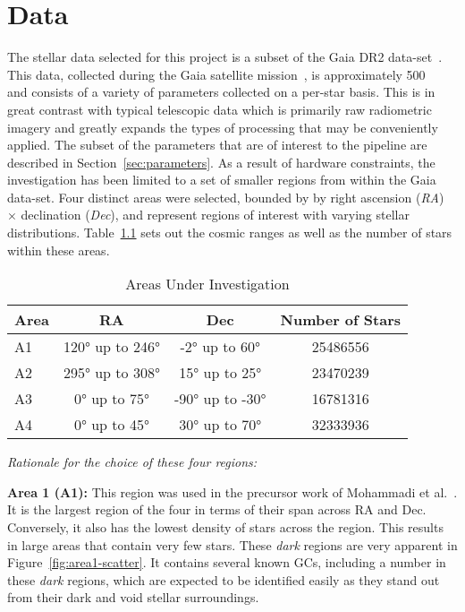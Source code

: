 \chapter{\label{chap:data}Data}

The stellar data selected for this project is a subset of the Gaia DR2 data-set~\cite{gaiaDr2}. This data, collected during the Gaia satellite mission~\cite{gaiaDr2}, is approximately \SI{500}{\giga\byte} and consists of a variety of parameters collected on a per-star basis. This is in great contrast with typical telescopic data which is primarily raw radiometric imagery and greatly expands the types of processing that may be conveniently applied. The subset of the parameters that are of interest to the pipeline are described in Section~\ref{sec:parameters}. As a result of hardware constraints, the investigation has been limited to a set of smaller regions from within the Gaia data-set. Four distinct areas were selected, bounded by by right ascension (\textit{RA}) $\times$ declination (\textit{Dec}), and represent regions of interest with varying stellar distributions. Table~\ref{tb:areas} sets out the cosmic ranges as well as the number of stars within these areas.

\begin{table}[H]
    \centering
    \caption{Areas Under Investigation}
    \label{tb:areas}
    \begin{tabular}{l c c c}
        \toprule
        Area & RA                        & Dec                       & Number of Stars \\
        \midrule
        A1   & \ang{120} up to \ang{246} & \ang{-2} up to \ang{60}   & \num{25486556}  \\
        A2   & \ang{295} up to \ang{308} & \ang{15} up to \ang{25}   & \num{23470239}  \\
        A3   & \ang{0} up to \ang{75}    & \ang{-90} up to \ang{-30} & \num{16781316}  \\
        A4   & \ang{0} up to \ang{45}    & \ang{30} up to \ang{70}   & \num{32333936}  \\
        \bottomrule
    \end{tabular}
\end{table}

\noindent \textit{Rationale for the choice of these four regions:}

\textbf{Area 1 (A1):}
This region was used in the precursor work of Mohammadi et al.~\cite{Mohammadi}.
It is the largest region of the four in terms of their span across RA and Dec.
Conversely, it also has the lowest density of stars across the region. This
results in large areas that contain very few stars. These \textit{dark} regions
are very apparent in Figure~\ref{fig:area1-scatter}. It contains several known
GCs, including a number in these \textit{dark} regions, which are expected to be
identified easily as they stand out from their dark and void stellar
surroundings.

